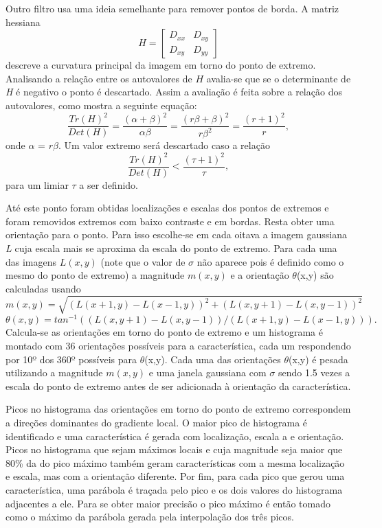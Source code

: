Outro filtro usa uma ideia semelhante para remover pontos de borda. A matriz hessiana \[ \textit{H} = \left[ \begin{array}{cc}
D_{xx} & D_{xy} \\ 
D_{xy} & D_{yy}
\end{array} \right]  \] descreve a curvatura principal da imagem em torno do ponto de extremo. Analisando a relação entre os autovalores de $\textit{H}$ avalia-se que se o determinante de \textit{H} é negativo o ponto é descartado. Assim a avaliação é feita sobre a relação dos autovalores, como mostra a seguinte equação: \begin{equation}\label{equacaoseg}
 \frac{\textit{Tr}(H)^2}{\textit{Det}(H)} = \frac{(\alpha + \beta)^2}{\alpha\beta} = \frac{(r\beta + \beta)^2}{r\beta^2} = \frac{(r + 1)^2}{r}, 
\end{equation} 
 onde $\alpha$ = $r\beta$. Um valor extremo será descartado caso a relação \[ \frac{\textit{Tr}(H)^2}{\textit{Det}(H)} < \frac{(\tau + 1)^2}{\tau}, \] para um limiar $\tau$ a ser definido.  

Até este ponto foram obtidas localizações e escalas dos pontos de extremos e foram removidos extremos com baixo contraste e em bordas. Resta obter uma orientação para o ponto. Para isso escolhe-se em cada oitava a imagem gaussiana \textit{L} cuja escala mais se aproxima da escala do ponto de extremo. Para cada uma das imagens $\textit{L}(x,y)$  (note que o valor de $\sigma$ não aparece pois é definido como o mesmo do ponto de extremo) a magnitude $\textit{m}(x,y)$ e a orientação $\theta$(x,y) são calculadas usando \[ \textit{m}(x,y) = \sqrt{(\textit{L}(x  +1,y) - \textit{L}(x - 1,y))^2 + (\textit{L}(x,y + 1) - \textit{L}(x,y - 1))^2} \] \[ \theta (x,y) = \textit{tan}^{-1}((\textit{L}(x,y +1) - \textit{L}(x,y - 1))/(\textit{L}(x + 1,y) - \textit{L}(x - 1,y))).\]
Calcula-se as orientações em torno do ponto de extremo e um histograma é montado com 36 orientações possíveis para a característica, cada um respondendo por 10º dos 360º possíveis para $\theta$(x,y). Cada uma das orientações $\theta$(x,y) é pesada utilizando a magnitude $\textit{m}(x,y)$ e uma janela gaussiana com $\sigma$ sendo 1.5 vezes a escala do ponto de extremo antes de ser adicionada à orientação da característica.

Picos no histograma das orientações em torno do ponto de extremo correspondem a direções dominantes do gradiente local. O maior pico de histograma é identificado e uma característica é gerada com localização, escala a e orientação. Picos no histograma que sejam máximos locais e cuja magnitude seja maior que 80\% da do pico máximo também geram características com a mesma localização e escala, mas com a orientação diferente. Por fim, para cada pico que gerou uma característica, uma parábola é traçada pelo pico e os dois valores do histograma adjacentes a ele. Para se obter maior precisão o pico máximo é então tomado como o máximo da parábola gerada pela interpolação dos três picos.


